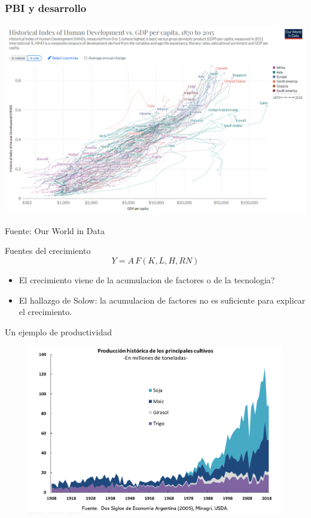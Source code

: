 \documentclass{beamer}
\begin{document}
\begin{frame}
\frametitle{PBI y desarrollo}
\begin{center}
    \href{https://ourworldindata.org/grapher/hdi-vs-gdp-per-capita} {\includegraphics[scale=0.35]{../Tema_11.27_hdi_2.png}}
\end{center}
Fuente: Our World in Data
\end{frame}

\begin{frame}{Fuentes del crecimiento}
   \begin{equation}
    Y = A\,F(K,L,H,RN)
\end{equation} 
\begin{itemize}
    \item El crecimiento viene de la acumulacion de factores o de la tecnologia?
    \item El hallazgo de Solow: la acumulacion de factores no es suficiente para explicar el crecimiento.
\end{itemize}
\end{frame}

\begin{frame}{Un ejemplo de productividad}
    \begin{figure} [H]   \includegraphics[scale=0.55]{../Figures/C17.3.png}
\label{fig:17.3}
\end{figure}
\end{frame}
\end{document}
